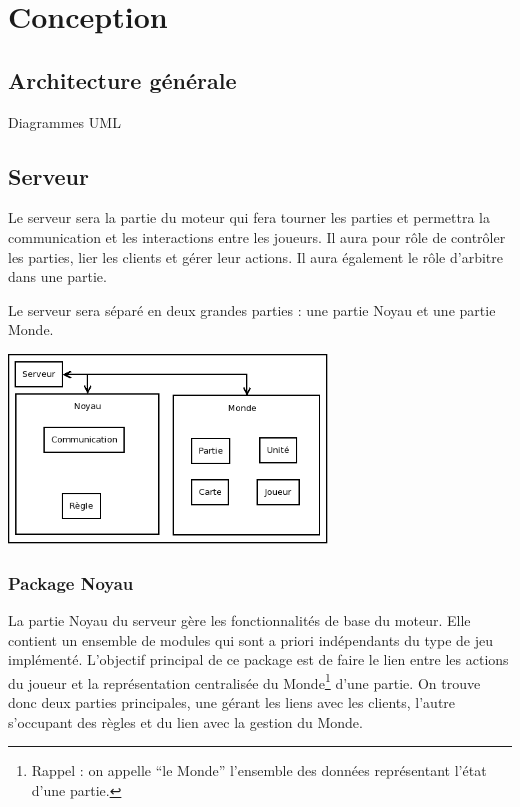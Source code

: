 \documentclass[a4paper,10pt]{report}
\begin{document}
  \chapter{Conception}

    \section{Architecture générale}

      Diagrammes UML


    \section{Serveur}

      Le serveur sera la partie du moteur qui fera tourner les parties et permettra la communication et les interactions entre les joueurs. Il aura pour rôle de contrôler les parties, lier les clients et gérer leur actions. Il aura également le rôle d'arbitre dans une partie. 

      Le serveur sera séparé en deux grandes parties : une partie Noyau et une partie Monde.

      \includegraphics[width=320px]{img/server-organisation.png}

      \subsection{Package Noyau}

        La partie Noyau du serveur gère les fonctionnalités de base du moteur. Elle contient un ensemble de modules qui sont a priori indépendants du type de jeu implémenté. L'objectif principal de ce package est de faire le lien entre les actions du joueur et la représentation centralisée du Monde\footnote{Rappel : on appelle ``le Monde'' l'ensemble des données représentant l'état d'une partie.} d'une partie. On trouve donc deux parties principales, une gérant les liens avec les clients, l'autre s'occupant des règles et du lien avec la gestion du Monde. 
\end{document}
